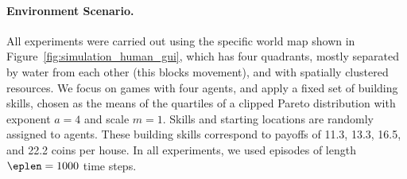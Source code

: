 \paragraph{Environment Scenario.}
All experiments were carried out using the specific world map shown in Figure~\ref{fig:simulation_human_gui}, which has four quadrants,  mostly separated by water  from each other (this blocks movement), and with spatially clustered resources.
We focus on games with four agents, and apply a fixed set of building skills,
 chosen as the means of the quartiles of a clipped Pareto distribution with exponent $a=4$ and scale $m=1$.
Skills and starting locations are randomly assigned to agents.
These building skills correspond to payoffs of 11.3, 13.3, 16.5, and 22.2 coins per house.
In all  experiments, we used episodes of length $\eplen = 1000$ time steps.











